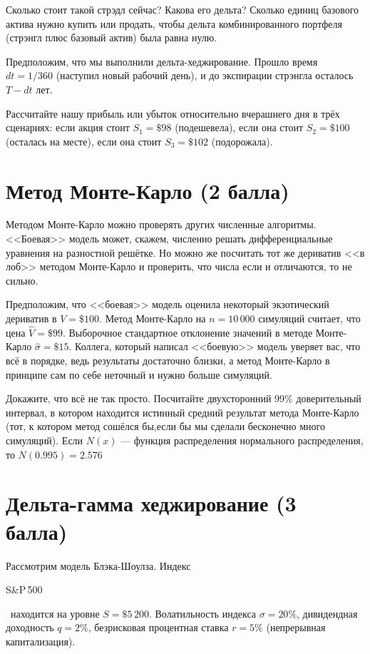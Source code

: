 \documentclass[a4paper,14pt]{extarticle}
\newcommand{\en}[1]{\begin{otherlanguage}{english}#1\end{otherlanguage}}
\begin{document}
Сколько стоит такой стрэдл сейчас? Какова его дельта? Сколько единиц базового актива нужно купить или продать, чтобы дельта комбинированного портфеля (стрэнгл плюс базовый актив) была равна нулю.

Предположим, что мы выполнили дельта-хеджирование. Прошло время $dt=1/360$ (наступил новый рабочий день), и до экспирации стрэнгла осталось $T-dt$ лет.

Рассчитайте нашу прибыль или убыток относительно вчерашнего дня в трёх сценариях:  если акция стоит $S_1=\$98$ (подешевела), если она стоит $S_2=\$100$ (осталась на месте), если она стоит $S_3=\$102$ (подорожала).


\section{Метод Монте-Карло (2 балла)}

Методом Монте-Карло можно проверять других численные алгоритмы. <<Боевая>> модель может, скажем, численно решать дифференциальные уравнения на разностной решётке. Но можно же посчитать тот же дериватив <<в лоб>> методом Монте-Карло и проверить, что числа если и отличаются, то не сильно.

Предположим, что <<боевая>> модель оценила некоторый экзотический дериватив в $V=\$100$. Метод Монте-Карло на $n=10\,000$ симуляций считает, что цена $\hat{V}=\$99$. Выборочное стандартное отклонение значений в методе Монте-Карло $\hat{\sigma}=\$15$. Коллега, который написал <<боевую>> модель уверяет вас, что всё в порядке, ведь результаты достаточно близки, а метод Монте-Карло в принципе сам по себе неточный и нужно больше симуляций.

Докажите, что всё не так просто. Посчитайте двухсторонний 99\% доверительный интервал, в котором находится истинный средний результат метода Монте-Карло (тот, к котором метод сошёлся бы,если бы мы сделали бесконечно много симуляций). Если $N(x)$ --- функция распределения нормального распределения, то $N(0.995) = 2.576$

\section{Дельта-гамма хеджирование (3 балла)}

Рассмотрим модель Блэка-Шоулза. Индекс \en{S\&P\,500}\ находится на уровне $S=\$5\,200$. Волатильность индекса $\sigma=20\%$, дивидендная доходность $q=2\%$, безрисковая процентная ставка $r=5\%$ (непрерывная капитализация).
\end{document}
